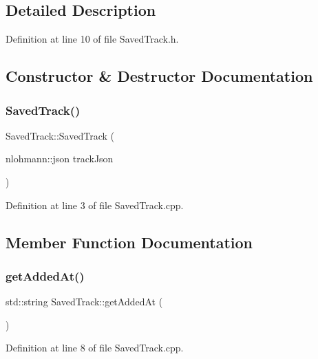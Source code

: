 \subsection{Detailed Description}


Definition at line 10 of file Saved\+Track.\+h.



\subsection{Constructor \& Destructor Documentation}
\mbox{\label{class_saved_track_aee98494de0777a97eecba292ac1ae1af}} 
\subsubsection{\texorpdfstring{Saved\+Track()}{SavedTrack()}}
{\footnotesize\ttfamily Saved\+Track\+::\+Saved\+Track (\begin{DoxyParamCaption}\item[{nlohmann\+::json}]{track\+Json }\end{DoxyParamCaption})}



Definition at line 3 of file Saved\+Track.\+cpp.



\subsection{Member Function Documentation}
\mbox{\label{class_saved_track_afc0b96082927d83e5bddc48754fe2b8f}} 
\subsubsection{\texorpdfstring{get\+Added\+At()}{getAddedAt()}}
{\footnotesize\ttfamily std\+::string Saved\+Track\+::get\+Added\+At (\begin{DoxyParamCaption}{ }\end{DoxyParamCaption})}



Definition at line 8 of file Saved\+Track.\+cpp.

